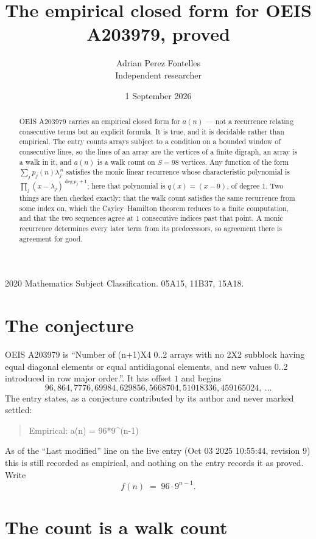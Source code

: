 \documentclass[11pt,a4paper]{article}
\title{The empirical closed form for OEIS A203979, proved}
\author{Adrian Perez Fontelles\\ \small Independent researcher}
\date{1 September 2026}
\theoremstyle{plain}
\theoremstyle{definition}
\begin{document}
\maketitle

\begin{abstract}
OEIS A203979 carries an empirical closed form for $a(n)$ --- not a recurrence relating
consecutive terms but an explicit formula. It is true, and it is decidable rather than
empirical. The entry counts arrays subject to a condition on a bounded window of consecutive lines, so the lines of an array are the
vertices of a finite digraph, an array is a walk in it, and $a(n)$ is a walk count on
$S=98$ vertices. Any function of the form $\sum_j p_j(n)\lambda_j^{\,n}$ satisfies the
monic linear recurrence whose characteristic polynomial is
$\prod_j(x-\lambda_j)^{\deg p_j+1}$; here that polynomial is $q(x)=(x-9)$, of degree
$1$. Two things are then checked exactly: that the walk count satisfies the same
recurrence from some index on, which the Cayley--Hamilton theorem reduces to a finite
computation, and that the two sequences agree at $1$ consecutive indices past that
point. A monic recurrence determines every later term from its predecessors, so agreement
there is agreement for good.
\end{abstract}

\noindent\small 2020 Mathematics Subject Classification. 05A15, 11B37, 15A18.\normalsize

\section{The conjecture}

OEIS A203979 is ``Number of (n+1)X4 0..2 arrays with no 2X2 subblock having equal diagonal elements or equal antidiagonal elements, and new values 0..2 introduced in row major order.''. It has offset $1$ and begins
\[
96, 864, 7776, 69984, 629856, 5668704, 51018336, 459165024,\ \dots
\]
The entry states, as a conjecture contributed by its author and never marked settled:
\begin{quote}
Empirical: a(n) = 96*9\^{}(n-1)
\end{quote}
As of the ``Last modified'' line on the live entry (Oct 03 2025 10:55:44, revision 9) this is still
recorded as empirical, and nothing on the entry records it as proved. Write
\[
f(n)\;=\;96 \cdot 9^{n - 1}.
\]

\section{The count is a walk count}
\end{document}
